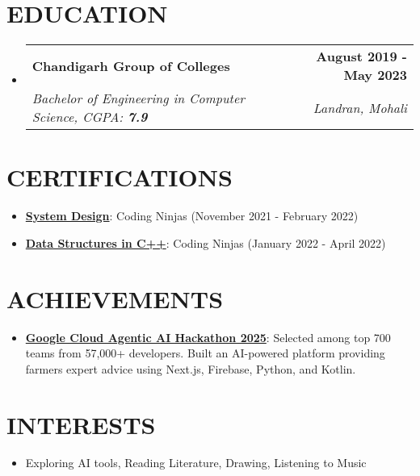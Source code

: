 \documentclass[letterpaper,11pt]{article}
\makeatletter
\newcommand{\resumeItem}[1]{
  \item\small{
    {#1 \vspace{-2pt}}
  }
}
\newcommand{\resumeSubheading}[4]{
  \vspace{-2pt}\item
    \begin{tabular*}{1.0\textwidth}[t]{l@{\extracolsep{\fill}}r}
      \textbf{\large#1} & \textbf{\small #2} \\
      \textit{\large#3} & \textit{\small #4} \\
      
    \end{tabular*}\vspace{-7pt}
}
\newcommand{\resumeSubHeadingListStart}{\begin{itemize}[leftmargin=0.0in, label={}]}
\newcommand{\resumeSubHeadingListEnd}{\end{itemize}}
\newcommand{\resumeItemListStart}{\begin{itemize}}
\newcommand{\resumeItemListEnd}{\end{itemize}\vspace{-5pt}}
\makeatother
\begin{document}
\section{EDUCATION}
  \resumeSubHeadingListStart
    \resumeSubheading
      {Chandigarh Group of Colleges}{August 2019 - May 2023}
      {Bachelor of Engineering in Computer Science, CGPA: \textbf{7.9}}{Landran, Mohali}
  \resumeSubHeadingListEnd

\section{CERTIFICATIONS}
    \vspace{0pt}
    \resumeItemListStart
        \resumeItem{\normalsize{\href{http://ninjasfiles.s3.amazonaws.com/certificate18894980e4209379ac28665887f78da42bac5c2.pdf}{\textbf{System Design}}: Coding Ninjas (November 2021 - February 2022)}}
        \resumeItem{\normalsize{\href{https://ninjasfiles.s3.amazonaws.com/certificate19853580c201378561a01f48ae87f59e9220db2.pdf}{\textbf{Data Structures in C++}}: Coding Ninjas (January 2022 - April 2022)}}
    \resumeItemListEnd

\section{ACHIEVEMENTS}
    \vspace{0pt}
    \resumeItemListStart
        \resumeItem{\normalsize{\href{https://github.com/abhikumar002/Agentic-Gig-Project}{\textbf{Google Cloud Agentic AI Hackathon 2025}}: Selected among top 700 teams from 57,000+ developers. Built an AI-powered platform providing farmers expert advice using Next.js, Firebase, Python, and Kotlin.}}
    \resumeItemListEnd

\section{INTERESTS}
    \vspace{0pt}
    \resumeItemListStart
        \resumeItem{\normalsize{Exploring AI tools, Reading Literature, Drawing, Listening to Music}}
    \resumeItemListEnd
\end{document}

